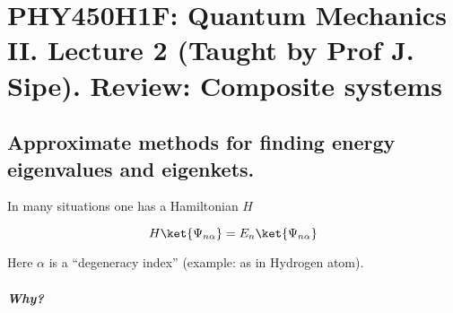 
%

\chapter{PHY450H1F: Quantum Mechanics II.  Lecture 2 (Taught by Prof J. Sipe).  Review: Composite systems}
\label{chap:qmTwoL2}
{}
\date{Sept 12, 2011}

\beginArtWithToc

\section{Approximate methods for finding energy eigenvalues and eigenkets.}

In many situations one has a Hamiltonian $H$

\begin{equation}\label{eqn:qmTwoL2:10}
H \ket{\Psi_{n \alpha}} = E_n \ket{\Psi_{n \alpha}}
\end{equation}

Here $\alpha$ is a ``degeneracy index'' (example: as in Hydrogen atom).

\paragraph{Why?}

